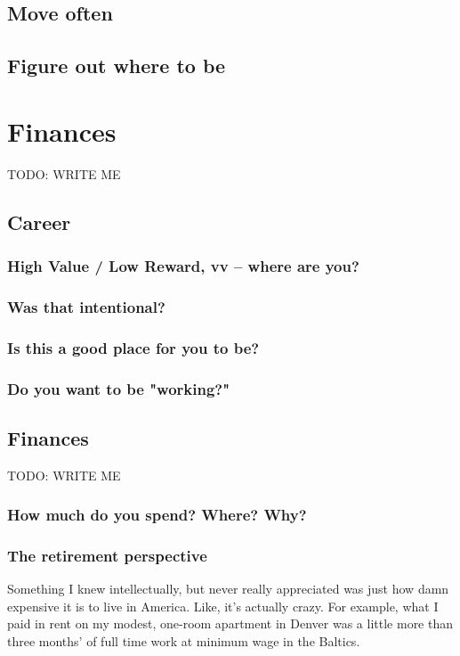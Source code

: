 \documentclass[]{book}
\newcommand{\TOWRITE}{TODO: WRITE ME}
\begin{document}
\section{Move often}
\section{Figure out where to be}


\chapter{Finances}
\TOWRITE
\section{Career}
\subsection{High Value / Low Reward, vv -- where are you?}
\subsection{Was that intentional?}
\subsection{Is this a good place for you to be?}
\subsection{Do you want to be "working?"}

\section{Finances}
\TOWRITE
\subsection{How much do you spend? Where? Why?}
\subsection{The retirement perspective}


Something I knew intellectually, but never really appreciated was just how damn
expensive it is to live in America. Like, it's actually crazy. For example, what
I paid in rent on my modest, one-room apartment in Denver was a little more than
three months' of full time work at minimum wage in the Baltics.
\end{document}

